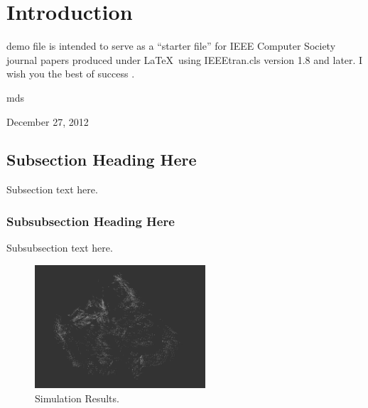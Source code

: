 \documentclass[12pt,journal,compsoc]{IEEEtran}
\begin{document}
\maketitle

\section{Introduction}

 demo file is intended to serve as a ``starter file''
for IEEE Computer Society journal papers produced under \LaTeX\ using
IEEEtran.cls version 1.8 and later.
I wish you the best of success \cite{1}\cite{2}\cite{3}\cite{4}\cite{5}\cite{6}\cite{7}.

\hfill mds
 
\hfill December 27, 2012

\subsection{Subsection Heading Here}
Subsection text here.


\subsubsection{Subsubsection Heading Here}
Subsubsection text here.


\begin{figure}[!t]
\centering
\includegraphics[width=2.5in]{femur_2}
\caption{Simulation Results.}
\label{fig_sim}
\end{figure}
\end{document}
